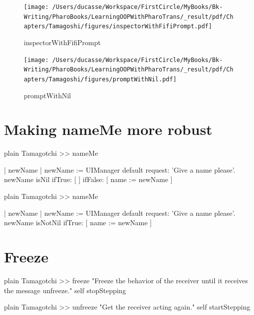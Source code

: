 \documentclass[10pt,twoside,english]{_support/latex/sbabook/sbabook}
\begin{document}
\begin{figure}

\begin{center}
\texttt{[image: /Users/ducasse/Workspace/FirstCircle/MyBooks/Bk-Writing/PharoBooks/LearningOOPWithPharoTrans/\_result/pdf/Chapters/Tamagoshi/figures/inspectorWithFifiPrompt.pdf]}\caption{inspectorWithFifiPrompt\label{inspectorWithFifiPrompt}}\end{center}
\end{figure}



\begin{figure}

\begin{center}
\texttt{[image: /Users/ducasse/Workspace/FirstCircle/MyBooks/Bk-Writing/PharoBooks/LearningOOPWithPharoTrans/\_result/pdf/Chapters/Tamagoshi/figures/promptWithNil.pdf]}\caption{promptWithNil\label{promptWithNil}}\end{center}
\end{figure}

\section{Making nameMe more robust}
\begin{displaycode}{plain}
Tamagotchi >> nameMe

	| newName |
	newName := UIManager default request: 'Give a name please'.
	newName isNil 
		ifTrue: [ ]
		ifFalse: [ name := newName ]
\end{displaycode}

\begin{displaycode}{plain}
Tamagotchi >> nameMe

	| newName |
	newName := UIManager default request: 'Give a name please'.
	newName isNotNil 
		ifTrue: [ name := newName ]
\end{displaycode}
\section{Freeze}
\begin{displaycode}{plain}
Tamagotchi >> freeze
	"Freeze the behavior of the receiver until it receives the message unfreeze."
	self stopStepping
\end{displaycode}

\begin{displaycode}{plain}
Tamagotchi >> unfreeze
	"Get the receiver acting again."
	self startStepping
\end{displaycode}
\end{document}
